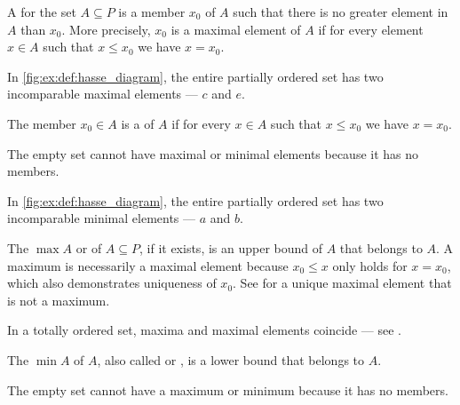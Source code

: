 \begin{definition}
\begin{thmenum}
    \begin{minipage}[t]{0.45\textwidth}
      A  for the set \( A \subseteq P \) is a member \( x_0 \) of \( A \) such that there is no greater element in \( A \) than \( x_0 \). More precisely, \( x_0 \) is a maximal element of \( A \) if for every element \( x \in A \) such that \( x \leq x_0 \) we have \( x = x_0 \).

      In \cref{fig:ex:def:hasse_diagram}, the entire partially ordered set has two incomparable maximal elements --- \( c \) and \( e \).
    \end{minipage}
    \hspace{0.02\textwidth}
    \begin{minipage}[t]{0.45\textwidth}
      The member \( x_0 \in A \) is a  of \( A \) if for every \( x \in A \) such that \( x \leq x_0 \) we have \( x = x_0 \).

      The empty set cannot have maximal or minimal elements because it has no members.

      In \cref{fig:ex:def:hasse_diagram}, the entire partially ordered set has two incomparable minimal elements --- \( a \) and \( b \).
    \end{minipage}

    \begin{minipage}[t]{0.45\textwidth}
      The  \( \max A \) or  of \( A \subseteq P \), if it exists, is an upper bound of \( A \) that belongs to \( A \). A maximum is necessarily a maximal element because \( x_0 \leq x \) only holds for \( x = x_0 \), which also demonstrates uniqueness of \( x_0 \). See  for a unique maximal element that is not a maximum.

      In a totally ordered set, maxima and maximal elements coincide --- see .
    \end{minipage}
    \hspace{0.02\textwidth}
    \begin{minipage}[t]{0.45\textwidth}
      The  \( \min A \) of \( A \), also called  or , is a lower bound that belongs to \( A \).

      The empty set cannot have a maximum or minimum because it has no members.


\end{minipage}
\end{thmenum}
\end{definition}
